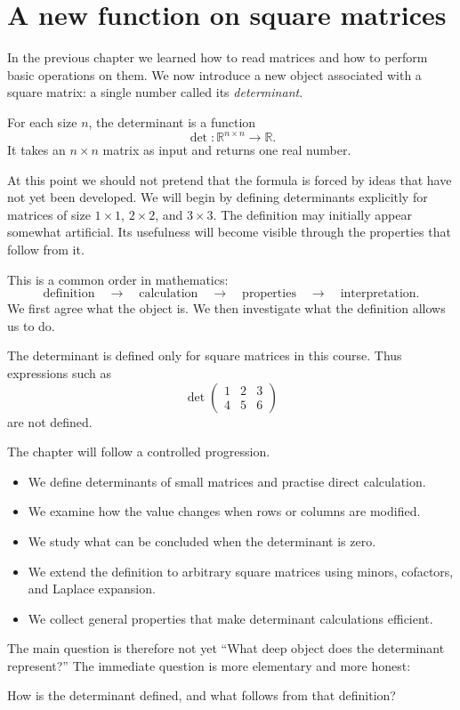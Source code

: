 \section{A new function on square matrices}

In the previous chapter we learned how to read matrices and how to perform basic operations on them. We now introduce a new object associated with a square matrix: a single number called its \emph{determinant}.

For each size \(n\), the determinant is a function
\[
\det\colon \mathbb{R}^{n\times n}\longrightarrow \mathbb{R}.
\]
It takes an \(n\times n\) matrix as input and returns one real number.

At this point we should not pretend that the formula is forced by ideas that have not yet been developed. We will begin by defining determinants explicitly for matrices of size \(1\times1\), \(2\times2\), and \(3\times3\). The definition may initially appear somewhat artificial. Its usefulness will become visible through the properties that follow from it.

This is a common order in mathematics:
\[
\text{definition}\quad\longrightarrow\quad
\text{calculation}\quad\longrightarrow\quad
\text{properties}\quad\longrightarrow\quad
\text{interpretation}.
\]
We first agree what the object is. We then investigate what the definition allows us to do.

\begin{remarkbox}
The determinant is defined only for square matrices in this course. Thus expressions such as
\[
\det\begin{pmatrix}1&2&3\\4&5&6\end{pmatrix}
\]
are not defined.
\end{remarkbox}

The chapter will follow a controlled progression.
\begin{itemize}
\item We define determinants of small matrices and practise direct calculation.
\item We examine how the value changes when rows or columns are modified.
\item We study what can be concluded when the determinant is zero.
\item We extend the definition to arbitrary square matrices using minors, cofactors, and Laplace expansion.
\item We collect general properties that make determinant calculations efficient.
\end{itemize}

The main question is therefore not yet ``What deep object does the determinant represent?'' The immediate question is more elementary and more honest:

\begin{summarybox}
How is the determinant defined, and what follows from that definition?
\end{summarybox}
